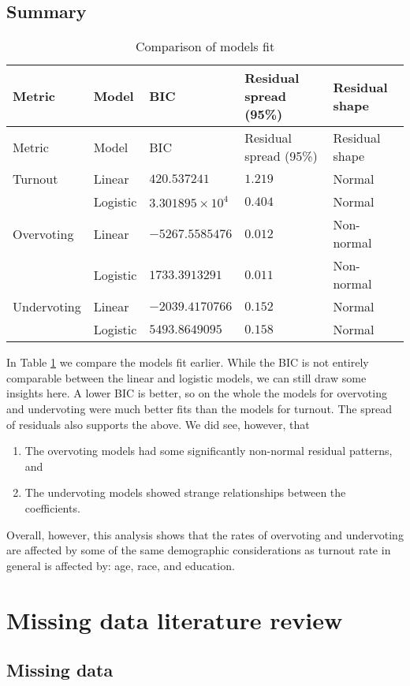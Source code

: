 \documentclass[12pt,twoside]{reedthesis}
\begin{document}
\hypertarget{summary}{%
\section{Summary}\label{summary}}
\begin{longtable}[]{@{}lllll@{}}
\caption{\label{tab:model-comp} Comparison of models fit}\tabularnewline
\toprule
Metric & Model & BIC & Residual spread (95\%) & Residual shape\tabularnewline
\midrule
\endfirsthead
\toprule
Metric & Model & BIC & Residual spread (95\%) & Residual shape\tabularnewline
\midrule
\endhead
Turnout & Linear & \(420.537241\) & \(1.219\) & Normal\tabularnewline
& Logistic & \(3.301895\times 10^{4}\) & \(0.404\) & Normal\tabularnewline
Overvoting & Linear & \(-5267.5585476\) & \(0.012\) & Non-normal\tabularnewline
& Logistic & \(1733.3913291\) & \(0.011\) & Non-normal\tabularnewline
Undervoting & Linear & \(-2039.4170766\) & \(0.152\) & Normal\tabularnewline
& Logistic & \(5493.8649095\) & \(0.158\) & Normal\tabularnewline
\bottomrule
\end{longtable}
In Table \ref{tab:model-comp} we compare the models fit earlier. While the BIC is not entirely comparable between the linear and logistic models, we can still draw some insights here. A lower BIC is better, so on the whole the models for overvoting and undervoting were much better fits than the models for turnout. The spread of residuals also supports the above. We did see, however, that
\begin{enumerate}
\def\labelenumi{\arabic{enumi}.}
\item
  The overvoting models had some significantly non-normal residual patterns, and
\item
  The undervoting models showed strange relationships between the coefficients.
\end{enumerate}
Overall, however, this analysis shows that the rates of overvoting and undervoting are affected by some of the same demographic considerations as turnout rate in general is affected by: age, race, and education.

\hypertarget{missing-litreview}{%
\chapter{Missing data literature review}\label{missing-litreview}}

\hypertarget{missing-data}{%
\section{Missing data}\label{missing-data}}
\end{document}

